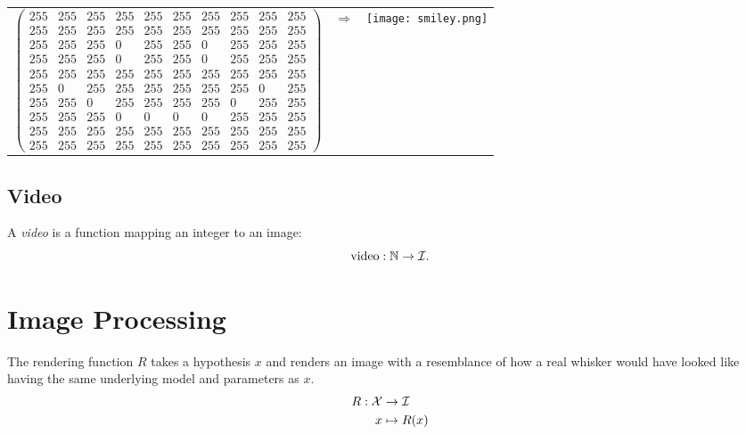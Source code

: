 \begin{example}~\\
  \begin{tabular}{lcr}
    $
    \begin{pmatrix} 
      255&  255&  255&  255&  255&  255&  255&  255&  255&  255\\
      255&  255&  255&  255&  255&  255&  255&  255&  255&  255\\
      255&  255&  255&    0&  255&  255&    0&  255&  255&  255\\
      255&  255&  255&    0&  255&  255&    0&  255&  255&  255\\
      255&  255&  255&  255&  255&  255&  255&  255&  255&  255\\
      255&    0&  255&  255&  255&  255&  255&  255&    0&  255\\
      255&  255&    0&  255&  255&  255&  255&    0&  255&  255\\
      255&  255&  255&    0&    0&    0&    0&  255&  255&  255\\
      255&  255&  255&  255&  255&  255&  255&  255&  255&  255\\
      255&  255&  255&  255&  255&  255&  255&  255&  255&  255
    \end{pmatrix}$
    &$\Rightarrow$& \parbox[c]{1em}{\texttt{[image: smiley.png]}}
    \end{tabular}
\end{example}

\subsection{Video}
\begin{definition}
  A \emph{video} is a function mapping an integer to an image:
  \begin{equation}
    \text{video} : \mathbb{N} \rightarrow \mathcal{I}.
  \end{equation}
\end{definition}

\section{Image Processing}

\begin{definition}
  The rendering function $R$ takes a hypothesis $x$ and renders an
  image with a resemblance of how a real whisker would have looked
  like having the same underlying model and parameters as $x$.
  \begin{equation}
    \begin{split}
      R : \mathcal{X} &\rightarrow \mathcal{I}\\
      x &\mapsto R(x)
    \end{split}
  \end{equation}
\end{definition}


